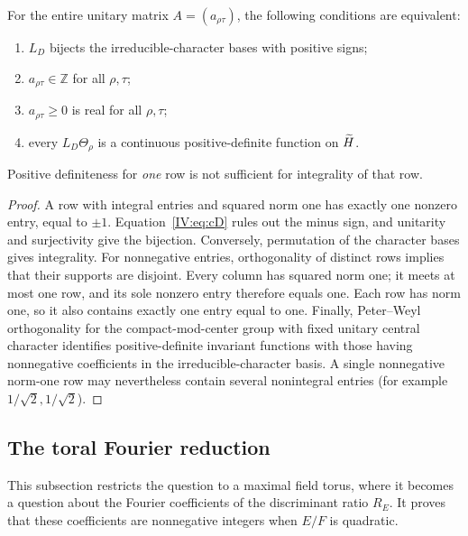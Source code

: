 \begin{proposition}\label{IV:prop:int}
For the entire unitary matrix $A=(a_{\rho\tau})$, the following
conditions are equivalent:
\begin{enumerate}[label=(\roman*)]
\item $L_D$ bijects the irreducible-character bases with positive signs;
\item $a_{\rho\tau}\in\mathbb Z$ for all $\rho,\tau$;
\item $a_{\rho\tau}\ge0$ is real for all $\rho,\tau$;
\item every $L_D\Theta_\rho$ is a continuous positive-definite
function on $\widetilde H$.
\end{enumerate}
Positive definiteness for \emph{one} row is not sufficient for
integrality of that row.
\end{proposition}
\begin{proof}
A row with integral entries and squared norm one has exactly one
nonzero entry, equal to $\pm1$.  Equation~\eqref{IV:eq:cD} rules out the
minus sign, and unitarity and surjectivity give the bijection.
Conversely, permutation of the character bases gives integrality.
For nonnegative entries, orthogonality of distinct rows implies
that their supports are disjoint.  Every column has squared norm
one; it meets at most one row, and its sole nonzero entry therefore
equals one.  Each row has norm one, so it also contains exactly one
entry equal to one.  Finally, Peter--Weyl orthogonality for the
compact-mod-center group with fixed unitary central character
identifies positive-definite invariant functions with those having
nonnegative coefficients in the irreducible-character basis.
A single nonnegative norm-one row may nevertheless contain several
nonintegral entries (for example $1/\sqrt2,1/\sqrt2$).
\end{proof}

\subsection{The toral Fourier reduction}
This subsection restricts the question to a maximal field torus, where it becomes a question about the Fourier coefficients of the discriminant ratio $R_E$. It proves that these coefficients are nonnegative integers when $E/F$ is quadratic.

